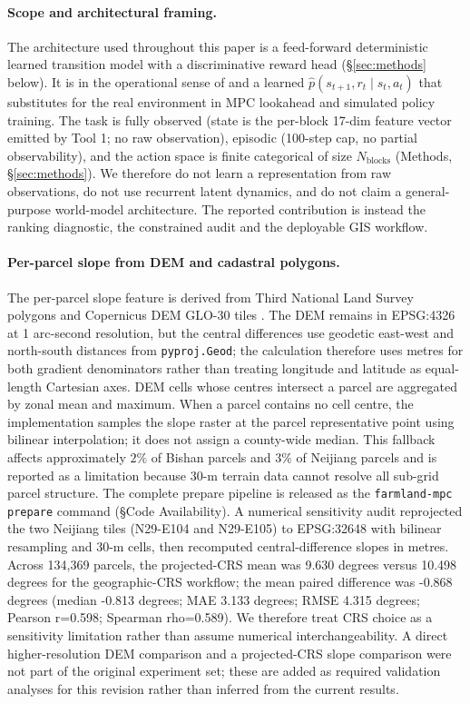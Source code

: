 \documentclass[11pt]{article}
\begin{document}
\paragraph{Scope and architectural framing.} The architecture used throughout this paper is a feed-forward deterministic learned transition model with a discriminative reward head (\S\ref{sec:methods} below). It is in the operational sense of \citet{chua2018deep} and \citet{janner2019trust} a learned $\hat{p}(s_{t+1}, r_t \mid s_t, a_t)$ that substitutes for the real environment in MPC lookahead and simulated policy training. The task is fully observed (state is the per-block 17-dim feature vector emitted by Tool 1; no raw observation), episodic (100-step cap, no partial observability), and the action space is finite categorical of size $N_{\text{blocks}}$ (Methods, \S\ref{sec:methods}). We therefore do not learn a representation from raw observations, do not use recurrent latent dynamics, and do not claim a general-purpose world-model architecture. The reported contribution is instead the ranking diagnostic, the constrained audit and the deployable GIS workflow.

\paragraph{Per-parcel slope from DEM and cadastral polygons.}\label{sec:methods-prepare}

The per-parcel slope feature is derived from Third National Land Survey polygons and Copernicus DEM GLO-30 tiles \citep{copernicus2021dem}. The DEM remains in EPSG:4326 at 1 arc-second resolution, but the central differences use geodetic east-west and north-south distances from \texttt{pyproj.Geod}; the calculation therefore uses metres for both gradient denominators rather than treating longitude and latitude as equal-length Cartesian axes. DEM cells whose centres intersect a parcel are aggregated by zonal mean and maximum. When a parcel contains no cell centre, the implementation samples the slope raster at the parcel representative point using bilinear interpolation; it does not assign a county-wide median. This fallback affects approximately $2\%$ of Bishan parcels and $3\%$ of Neijiang parcels and is reported as a limitation because 30-m terrain data cannot resolve all sub-grid parcel structure. The complete prepare pipeline is released as the \texttt{farmland-mpc prepare} command (\S Code Availability). A numerical sensitivity audit reprojected the two Neijiang tiles (N29-E104 and N29-E105) to EPSG:32648 with bilinear resampling and 30-m cells, then recomputed central-difference slopes in metres. Across 134,369 parcels, the projected-CRS mean was 9.630 degrees versus 10.498 degrees for the geographic-CRS workflow; the mean paired difference was -0.868 degrees (median -0.813 degrees; MAE 3.133 degrees; RMSE 4.315 degrees; Pearson r=0.598; Spearman rho=0.589). We therefore treat CRS choice as a sensitivity limitation rather than assume numerical interchangeability. A direct higher-resolution DEM comparison and a projected-CRS slope comparison were not part of the original experiment set; these are added as required validation analyses for this revision rather than inferred from the current results.
\end{document}
